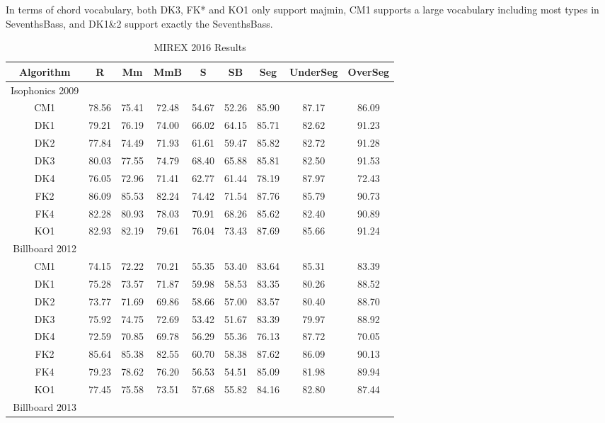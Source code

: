 In terms of chord vocabulary, both DK3, FK* and KO1 only support majmin, CM1 supports a large vocabulary including most types in SeventhsBass, and DK1\&2 support exactly the SeventhsBass.

\begin{table*}[htb]
\centering
\scriptsize
\caption{MIREX 2016 Results}
\label{tab:3-mirex2016}
\begin{tabular}{|c|c|c|c|c|c|c|c|c|}\hline
Algorithm & R & Mm & MmB & S & SB & Seg & UnderSeg & OverSeg \\ \hline
Isophonics 2009\\ \hline
CM1 & 78.56 & 75.41 & 72.48 & 54.67 & 52.26 & 85.90 & 87.17 & 86.09\\ \hline
DK1 & 79.21 & 76.19 & 74.00 & 66.02 & 64.15 & 85.71 & 82.62 & 91.23\\ \hline
DK2 & 77.84 & 74.49 & 71.93 & 61.61 & 59.47 & 85.82 & 82.72 & 91.28\\ \hline
DK3 & 80.03 & 77.55 & 74.79 & 68.40 & 65.88 & 85.81 & 82.50 & 91.53\\ \hline
DK4 & 76.05 & 72.96 & 71.41 & 62.77 & 61.44 & 78.19 & 87.97 & 72.43\\ \hline
FK2 & 86.09 & 85.53 & 82.24 & 74.42 & 71.54 & 87.76 & 85.79 & 90.73\\ \hline
FK4 & 82.28 & 80.93 & 78.03 & 70.91 & 68.26 & 85.62 & 82.40 & 90.89\\ \hline
KO1 & 82.93 & 82.19 & 79.61 & 76.04 & 73.43 & 87.69 & 85.66 & 91.24\\ \hline
Billboard 2012 \\ \hline
CM1 & 74.15 & 72.22 & 70.21 & 55.35 & 53.40 & 83.64 & 85.31 & 83.39\\ \hline
DK1 & 75.28 & 73.57 & 71.87 & 59.98 & 58.53 & 83.35 & 80.26 & 88.52\\ \hline
DK2 & 73.77 & 71.69 & 69.86 & 58.66 & 57.00 & 83.57 & 80.40 & 88.70\\ \hline
DK3 & 75.92 & 74.75 & 72.69 & 53.42 & 51.67 & 83.39 & 79.97 & 88.92\\ \hline
DK4 & 72.59 & 70.85 & 69.78 & 56.29 & 55.36 & 76.13 & 87.72 & 70.05\\ \hline
FK2 & 85.64 & 85.38 & 82.55 & 60.70 & 58.38 & 87.62 & 86.09 & 90.13\\ \hline
FK4 & 79.23 & 78.62 & 76.20 & 56.53 & 54.51 & 85.09 & 81.98 & 89.94\\ \hline
KO1 & 77.45 & 75.58 & 73.51 & 57.68 & 55.82 & 84.16 & 82.80 & 87.44\\ \hline
Billboard 2013 \\ \hline

\end{tabular}
\end{table*}
